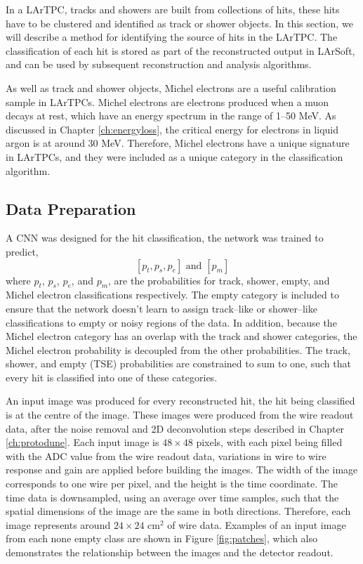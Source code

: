 In a LArTPC, tracks and showers are built from collections of hits, these hits
have to be clustered and identified as track or shower objects. In this section,
we will describe a method for identifying the source of hits in the \protodune{}
LArTPC. The classification of each hit is stored as part of the reconstructed
output in LArSoft, and can be used by subsequent reconstruction and analysis
algorithms.

As well as track and shower objects, Michel electrons are a useful calibration
sample in LArTPCs. Michel electrons are electrons produced when a muon decays at
rest, which have an energy spectrum in the range of 1--50 MeV. As discussed in 
Chapter \ref{ch:energyloss}, the critical energy for electrons in liquid argon
is at around 30 MeV. Therefore, Michel electrons have a unique signature in
LArTPCs, and they were included as a unique category in the classification
algorithm.

\subsection{Data Preparation}

A CNN was designed for the hit classification, the network was trained to
predict,
\begin{equation*}
	\left[ p_t, p_s, p_e \right] \mbox{ and } \left[ p_m \right]
\end{equation*}
where $p_t$, $p_s$, $p_e$, and $p_m$, are the probabilities for track, shower,
empty, and Michel electron classifications respectively. The empty category is
included to ensure that the network doesn't learn to assign track--like or
shower--like classifications to empty or noisy regions of the data. In addition,
because the Michel electron category has an overlap with the track and shower
categories, the Michel electron probability is decoupled from the other
probabilities. The track, shower, and empty (TSE) probabilities are 
constrained to sum to one, such that every hit is classified into one of these 
categories.

An input image was produced for every reconstructed hit, the hit being
classified is at the centre of the image. These images were produced from the 
wire readout data, after the noise removal and 2D deconvolution steps 
described in Chapter \ref{ch:protodune}. Each input image is $48 \times 48$
pixels, with each pixel being filled with the ADC value from the wire readout
data, variations in wire to wire response and gain are applied before building
the images. The width of the image corresponds to one wire per pixel, and the 
height is the time coordinate. The time data is downsampled, using an average 
over time samples, such that the spatial dimensions of the image are the same 
in both directions. Therefore, each image represents around $24 \times 24 
\mbox{ cm}^2$ of wire data. Examples of an input image from each none empty 
class are shown in Figure \ref{fig:patches}, which also demonstrates the 
relationship between the images and the detector readout.

